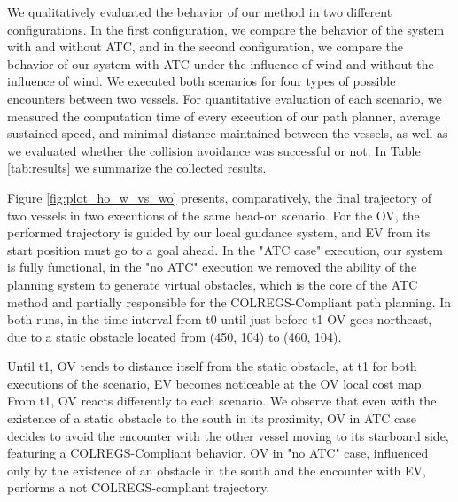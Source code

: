         We qualitatively evaluated the behavior of our method in two different configurations. In the first configuration, we compare the behavior of the system with and without \ac{ATC}, and in the second configuration, we compare the behavior of our system with \ac{ATC} under the influence of wind and without the influence of wind. We executed both scenarios for four types of possible encounters between two vessels. For quantitative evaluation of each scenario, we measured the computation time of every execution of our path planner, average sustained speed, and minimal distance maintained between the vessels, as well as we evaluated whether the collision avoidance was successful or not. In Table \ref{tab:results} we summarize the collected results.

        Figure \ref{fig:plot_ho_w_vs_wo} presents, comparatively, the final trajectory of two vessels in two executions of the same head-on scenario. For the \ac{OV}, the performed trajectory is guided by our local guidance system, and \ac{EV} from its start position must go to a goal ahead. In the "\ac{ATC} case" execution, our system is fully functional, in the "no \ac{ATC}" execution we removed the ability of the planning system to generate virtual obstacles, which is the core of the \ac{ATC} method and partially responsible for the COLREGS-Compliant path planning. In both runs, in the time interval from t0 until just before t1 \ac{OV} goes northeast, due to a static obstacle located from (450, 104) to (460, 104).
        
        Until t1, \ac{OV} tends to distance itself from the static obstacle, at t1 for both executions of the scenario, \ac{EV} becomes noticeable at the \ac{OV} local cost map. From t1, \ac{OV} reacts differently to each scenario. We observe that even with the existence of a static obstacle to the south in its proximity, \ac{OV} in \ac{ATC} case decides to avoid the encounter with the other vessel moving to its starboard side, featuring a COLREGS-Compliant behavior. \ac{OV} in "no \ac{ATC}" case, influenced only by the existence of an obstacle in the south and the encounter with \ac{EV}, performs a not COLREGS-compliant trajectory.

